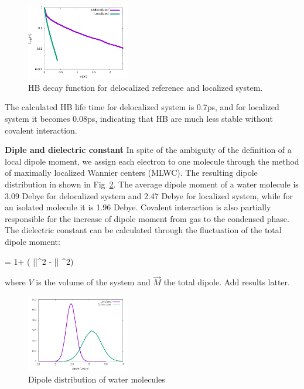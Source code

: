 \documentclass[prl,twocolumn,showpacs]{revtex4}
\begin{document}
\begin{figure}
\includegraphics[width=0.4\textwidth]{HB_decay}
\caption{HB decay function for delocalized reference and localized system.} \label{Fig:HBdecay}
\end{figure}

The calculated HB life time for delocalized system is 0.7ps, and for localized system it becomes 0.08ps, indicating that HB are much less stable without covalent interaction. 
 
\textbf{Diple and dielectric constant}
In spite of the ambiguity of the definition of a local dipole moment, we assign each electron to one molecule through the method of maximally localized Wannier centers (MLWC). The resulting dipole distribution in shown in Fig~\ref{Fig:dipoledist}. The average dipole moment of a water molecule is 3.09 Debye for delocalized system and 2.47 Debye for localized system, while for an isolated molecule it is 1.96 Debye. \new Covalent interaction is also partially responsible for the increase of dipole moment from gas to the condensed phase. \old The dielectric constant can be calculated through the fluctuation of the total dipole moment\cite{neumann1983dipole,adams1981theory}:

\bea
\epsilon = 1+  (  \langle ||^2 \rangle  - \langle || \rangle ^2) \label{Eq:dielectric}
\eea

where $V$ is the volume of the system and $\vec{M}$ the total dipole. \new Add results latter.\old

\begin{figure}
\includegraphics[width=0.4\textwidth]{dipole_dist}
\caption{Dipole distribution of water molecules} \label{Fig:dipoledist}
\end{figure}
\end{document}
